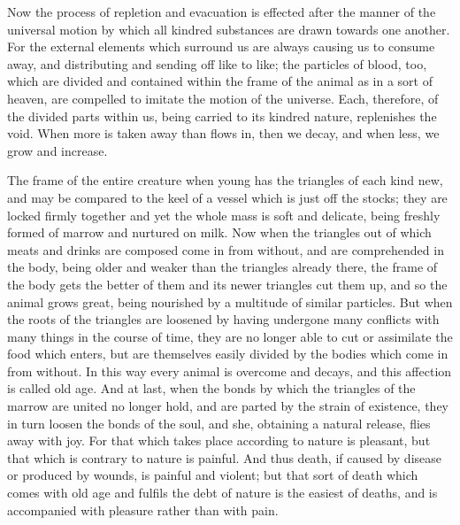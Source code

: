 \documentclass[11pt,letter]{article}
\begin{document}
\par  Now the process of repletion and evacuation is effected after the manner of the universal motion by which all kindred substances are drawn towards one another. For the external elements which surround us are always causing us to consume away, and distributing and sending off like to like; the particles of blood, too, which are divided and contained within the frame of the animal as in a sort of heaven, are compelled to imitate the motion of the universe. Each, therefore, of the divided parts within us, being carried to its kindred nature, replenishes the void. When more is taken away than flows in, then we decay, and when less, we grow and increase.

\par  The frame of the entire creature when young has the triangles of each kind new, and may be compared to the keel of a vessel which is just off the stocks; they are locked firmly together and yet the whole mass is soft and delicate, being freshly formed of marrow and nurtured on milk. Now when the triangles out of which meats and drinks are composed come in from without, and are comprehended in the body, being older and weaker than the triangles already there, the frame of the body gets the better of them and its newer triangles cut them up, and so the animal grows great, being nourished by a multitude of similar particles. But when the roots of the triangles are loosened by having undergone many conflicts with many things in the course of time, they are no longer able to cut or assimilate the food which enters, but are themselves easily divided by the bodies which come in from without. In this way every animal is overcome and decays, and this affection is called old age. And at last, when the bonds by which the triangles of the marrow are united no longer hold, and are parted by the strain of existence, they in turn loosen the bonds of the soul, and she, obtaining a natural release, flies away with joy. For that which takes place according to nature is pleasant, but that which is contrary to nature is painful. And thus death, if caused by disease or produced by wounds, is painful and violent; but that sort of death which comes with old age and fulfils the debt of nature is the easiest of deaths, and is accompanied with pleasure rather than with pain.
\end{document}
